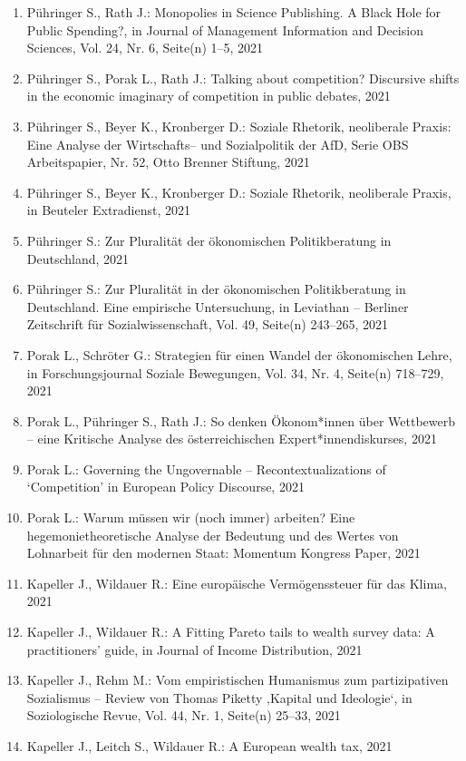 \begin{enumerate}
	 \item Pühringer S., Rath J.: Monopolies in Science Publishing. A Black Hole for Public Spending?, in Journal of Management Information and Decision Sciences, Vol. 24, Nr. 6, Seite(n) 1--5, 2021
	 \item Pühringer S., Porak L., Rath J.: Talking about competition? Discursive shifts in the economic imaginary of competition in public debates, 2021
	 \item Pühringer S., Beyer K., Kronberger D.: Soziale Rhetorik, neoliberale Praxis: Eine Analyse der Wirtschafts-- und Sozialpolitik der AfD, Serie OBS Arbeitspapier, Nr. 52, Otto Brenner Stiftung, 2021
	 \item Pühringer S., Beyer K., Kronberger D.: Soziale Rhetorik, neoliberale Praxis, in Beuteler Extradienst, 2021
	 \item Pühringer S.: Zur Pluralität der ökonomischen Politikberatung in Deutschland, 2021
	 \item Pühringer S.: Zur Pluralität in der ökonomischen Politikberatung in Deutschland. Eine empirische Untersuchung, in Leviathan -- Berliner Zeitschrift für Sozialwissenschaft, Vol. 49, Seite(n) 243--265, 2021
	 \item Porak L., Schröter G.: Strategien für einen Wandel der ökonomischen Lehre, in Forschungsjournal Soziale Bewegungen, Vol. 34, Nr. 4, Seite(n) 718--729, 2021
	 \item Porak L., Pühringer S., Rath J.: So denken Ökonom*innen über Wettbewerb – eine Kritische Analyse des österreichischen Expert*innendiskurses, 2021
	 \item Porak L.: Governing the Ungovernable -- Recontextualizations of ‘Competition’ in European Policy Discourse, 2021
	 \item Porak L.: Warum müssen wir (noch immer) arbeiten? Eine hegemonietheoretische Analyse der Bedeutung und des Wertes von Lohnarbeit für den modernen Staat: Momentum Kongress Paper, 2021
	 \item Kapeller J., Wildauer R.: Eine europäische Vermögenssteuer für das Klima, 2021
	 \item Kapeller J., Wildauer R.: A Fitting Pareto tails to wealth survey data: A practitioners’ guide, in Journal of Income Distribution, 2021
	 \item Kapeller J., Rehm M.: Vom empiristischen Humanismus zum partizipativen Sozialismus – Review von Thomas Piketty ‚Kapital und Ideologie‘, in Soziologische Revue, Vol. 44, Nr. 1, Seite(n) 25--33, 2021
	 \item Kapeller J., Leitch S., Wildauer R.: A European wealth tax, 2021

\end{enumerate}
